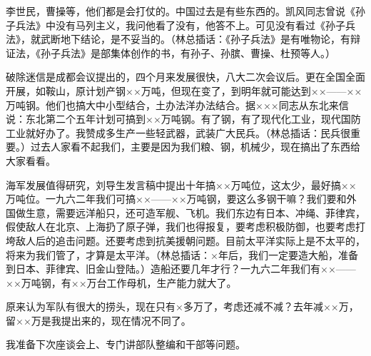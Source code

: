 李世民，曹操等，他们都是会打仗的。中国过去是有些东西的。凯风同志曾说《孙子兵法》中没有马列主义，我问他看了没有，他答不上。可见没有看过《孙子兵法》，就武断地下结论，是不妥当的。（林总插话：《孙子兵法》是有唯物论，有辩证法，《孙子兵法》是部集体创作的书，有孙子、孙膑、曹操、杜预等人。）

破除迷信是成都会议提出的，四个月来发展很快，八大二次会议后。更在全国全面开展，如鞍山，原计划产钢××万吨，但现在变了，到明年就可能达到××——××万吨钢。他们也搞大中小型结合，土办法洋办法结合。据×××同志从东北来信说：东北第二个五年计划可搞到××万吨钢。有了钢，有了现代化工业，现代国防工业就好办了。我赞成多生产一些轻武器，武装广大民兵。（林总插话：民兵很重要。）过去人家看不起我们，主要是因为我们粮、钢，机械少，现在搞出了东西给大家看看。

海军发展值得研究，刘导生发言稿中提出十年搞××万吨位，这太少，最好搞××万吨位。一九六二年我们可搞××——××万吨钢，要这么多钢干嘛？我们要和外国做生意，需要远洋船只，还可造军舰、飞机。我们东边有日本、冲绳、菲律宾，假使敌人在北京、上海扔了原子弹，我们也得报复，要考虑积极防御，也要考虑打垮敌人后的追击问题。还要考虑到抗美援朝问题。目前太平洋实际上是不太平的，将来为我们管了，才算是太平洋。（林总插话：×年后，我们一定要造大船，准备到日本、菲律宾、旧金山登陆。）造船还要几年才行？一九六二年我们有××——××万吨钢，有××万台工作母机，生产能力就大了。

原来认为军队有很大的捞头，现在只有×多万了，考虑还减不减？去年减××万，留××万是我提出来的，现在情况不同了。

我准备下次座谈会上、专门讲部队整编和干部等问题。



